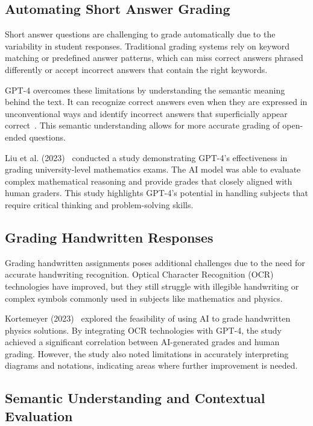 \documentclass[ms,twoside,print]{nuthesis}
\begin{document}
\subsection{Automating Short Answer Grading}

Short answer questions are challenging to grade automatically due to the variability in student responses. Traditional grading systems rely on keyword matching or predefined answer patterns, which can miss correct answers phrased differently or accept incorrect answers that contain the right keywords.

GPT-4 overcomes these limitations by understanding the semantic meaning behind the text. It can recognize correct answers even when they are expressed in unconventional ways and identify incorrect answers that superficially appear correct~\cite{Liu2023}. This semantic understanding allows for more accurate grading of open-ended questions.

Liu et al. (2023)~\cite{Liu2023} conducted a study demonstrating GPT-4's effectiveness in grading university-level mathematics exams. The AI model was able to evaluate complex mathematical reasoning and provide grades that closely aligned with human graders. This study highlights GPT-4's potential in handling subjects that require critical thinking and problem-solving skills.

\subsection{Grading Handwritten Responses}

Grading handwritten assignments poses additional challenges due to the need for accurate handwriting recognition. Optical Character Recognition (OCR) technologies have improved, but they still struggle with illegible handwriting or complex symbols commonly used in subjects like mathematics and physics.

Kortemeyer (2023)~\cite{Kortemeyer2023} explored the feasibility of using AI to grade handwritten physics solutions. By integrating OCR technologies with GPT-4, the study achieved a significant correlation between AI-generated grades and human grading. However, the study also noted limitations in accurately interpreting diagrams and notations, indicating areas where further improvement is needed.

\subsection{Semantic Understanding and Contextual Evaluation}
\end{document}
